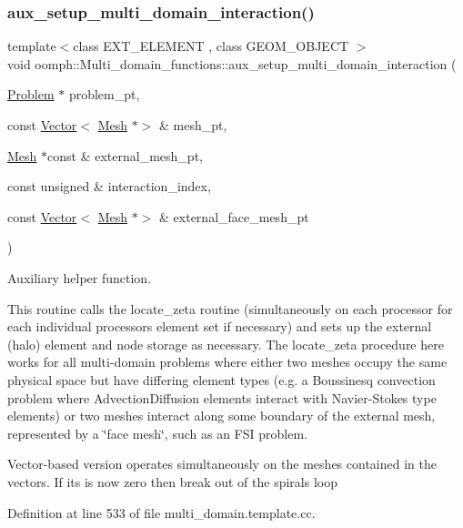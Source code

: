 \subsubsection{\texorpdfstring{aux\+\_\+setup\+\_\+multi\+\_\+domain\+\_\+interaction()}{aux\_setup\_multi\_domain\_interaction()}\hspace{0.1cm}{\footnotesize\ttfamily [2/2]}}
{\footnotesize\ttfamily template$<$class E\+X\+T\+\_\+\+E\+L\+E\+M\+E\+NT , class G\+E\+O\+M\+\_\+\+O\+B\+J\+E\+CT $>$ \\
void oomph\+::\+Multi\+\_\+domain\+\_\+functions\+::aux\+\_\+setup\+\_\+multi\+\_\+domain\+\_\+interaction (\begin{DoxyParamCaption}\item[{\hyperlink{classoomph_1_1Problem}{Problem} $\ast$}]{problem\+\_\+pt,  }\item[{const \hyperlink{classoomph_1_1Vector}{Vector}$<$ \hyperlink{classoomph_1_1Mesh}{Mesh} $\ast$$>$ \&}]{mesh\+\_\+pt,  }\item[{\hyperlink{classoomph_1_1Mesh}{Mesh} $\ast$const \&}]{external\+\_\+mesh\+\_\+pt,  }\item[{const unsigned \&}]{interaction\+\_\+index,  }\item[{const \hyperlink{classoomph_1_1Vector}{Vector}$<$ \hyperlink{classoomph_1_1Mesh}{Mesh} $\ast$$>$ \&}]{external\+\_\+face\+\_\+mesh\+\_\+pt }\end{DoxyParamCaption})}



Auxiliary helper function. 

This routine calls the locate\+\_\+zeta routine (simultaneously on each processor for each individual processor\textquotesingle{}s element set if necessary) and sets up the external (halo) element and node storage as necessary. The locate\+\_\+zeta procedure here works for all multi-\/domain problems where either two meshes occupy the same physical space but have differing element types (e.\+g. a Boussinesq convection problem where Advection\+Diffusion elements interact with Navier-\/\+Stokes type elements) or two meshes interact along some boundary of the external mesh, represented by a \char`\"{}face mesh\char`\"{}, such as an F\+SI problem.

Vector-\/based version operates simultaneously on the meshes contained in the vectors. If it\textquotesingle{}s is now zero then break out of the spirals loop 

Definition at line 533 of file multi\+\_\+domain.\+template.\+cc.



